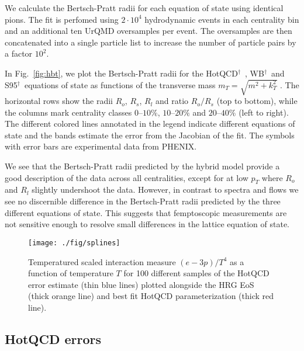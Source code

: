 \documentclass[aps,prc,reprint,amsmath,nofootinbib,superscriptaddress]{revtex4-1}
\newcommand{\hotqcd}{HotQCD$^\dagger$~}
\newcommand{\wb}{WB$^\dagger$~}
\newcommand{\spv}{S95$^\dagger$~}
\begin{document}
We calculate the Bertsch-Pratt radii for each equation of state using identical pions. The fit is perfomed using $2\cdot10^4$ hydrodynamic events in each centrality bin and an additional ten UrQMD oversamples per event. 
The oversamples are then concatenated into a single particle list to increase the number of particle pairs by a factor $10^2$.

In Fig.~\ref{fig:hbt}, we plot the Bertsch-Pratt radii for the \hotqcd, \wb and \spv equations of state as functions of the transverse mass $m_T = \sqrt{m^2 + k_T^2}$ . The horizontal rows show the radii $R_o$, $R_s$, $R_l$ and ratio $R_o/R_s$ (top to bottom), while the columns 
mark centrality classes $0$--$10\%$, $10$--$20\%$ and $20$--$40\%$ (left to right). The different colored lines annotated in the legend indicate different equations of state and the bands estimate the error from the Jacobian 
of the fit. The symbols with error bars are experimental data from PHENIX.

We see that the Bertsch-Pratt radii predicted by the hybrid model provide a good description of the data across all centralities, except for at low $p_T$ where $R_o$ and $R_l$ slightly undershoot the data. However, in contrast to
spectra and flows we see no discernible difference in the Bertsch-Pratt radii predicted by the three different equations of state. This suggests that femptoscopic measurements are not sensitive enough to resolve small differences
in the lattice equation of state.

\begin{figure}[b]
  \texttt{[image: ./fig/splines]}
  \caption{
    \label{fig:splines}
    Temperatured scaled interaction measure $(e-3 p)/T^4$ as a function of temperature $T$ for 100 different samples of the HotQCD error estimate (thin blue lines) plotted alongside the HRG EoS (thick orange line) and best fit HotQCD parameterization (thick red line).
  }
\end{figure}


\subsection{HotQCD errors}
\label{errors}
\end{document}
